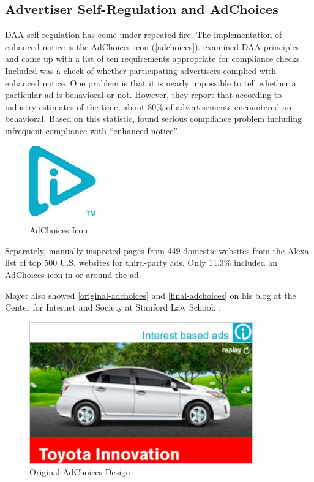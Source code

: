 \subsection{Advertiser Self-Regulation and AdChoices}
\label{advertiserself-regulationandadchoices}

DAA self-regulation has come under repeated fire. The implementation of enhanced notice is the AdChoices icon  (\autoref{adchoices}).  \citet*{Komanduri:2012wo}  examined DAA principles and came up with a list of ten requirements appropriate for compliance checks. Included was a check of whether participating advertisers complied with enhanced notice. One problem is that it is nearly impossible to tell whether a particular ad is behavioral or not. However, they report that according to industry estimates of the time, about 80\% of advertisements encountered are behavioral. Based on this statistic,  \citet{Komanduri:2012wo}  found serious compliance problem including infrequent compliance with ``enhanced notice''.


\begin{figure}
\centerline{
\includegraphics[scale=.5]{chapter6.tex/adchoices}
}
\caption{AdChoices Icon}
\label{adchoices}
\end{figure}


Separately,  \cite{J:2011wm}  manually inspected pages from 449 domestic websites from the Alexa list of top 500 U.S. websites for third-party ads. Only 11.3\% included an AdChoices icon in or around the ad.

Mayer also showed \autoref{original-adchoices} and \autoref{final-adchoices} on his blog at the Center for Internet and Society at Stanford Law School: \cite{J:2011wm}:

\begin{figure}
\centerline{
\includegraphics[scale=.75]{chapter6.tex/adchoices_original}
}
\caption{Original AdChoices Design}
\label{original-adchoices}
\end{figure}

